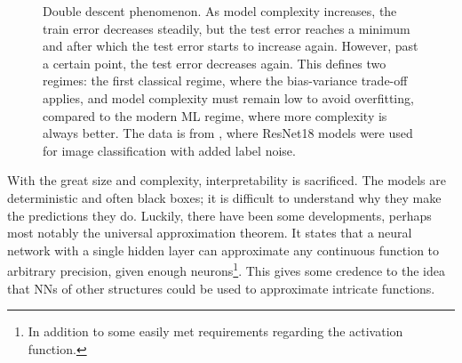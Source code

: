 \begin{figure}[htbp]
    \centering
    \caption{
        Double descent phenomenon.
        As model complexity increases, the train error decreases steadily, but the test error reaches a minimum and after which the test error starts to increase again.
        However, past a certain point, the test error decreases again.
        This defines two regimes: the first classical regime, where the bias-variance trade-off applies, and model complexity must remain low to avoid overfitting, compared to the modern ML regime, where more complexity is always better.
        The data is from \cite{nakkiran2021}, where ResNet18 models were used for image classification with added label noise.
    }
    \label{fig:double_descent}
\end{figure}

With the great size and complexity, interpretability is sacrificed.
The models are deterministic and often black boxes; it is difficult to understand why they make the predictions they do.
Luckily, there have been some developments, perhaps most notably the universal approximation theorem.
It states that a neural network with a single hidden layer can approximate any continuous function to arbitrary precision, given enough neurons\footnote{In addition to some easily met requirements regarding the activation function.}.
This gives some credence to the idea that NNs of other structures could be used to approximate intricate functions.


